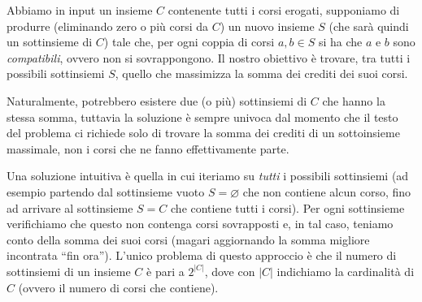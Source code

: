 

Abbiamo in input un insieme $C$ contenente tutti i corsi erogati, supponiamo di produrre (eliminando zero o più corsi da $C$) un nuovo insieme $S$ (che sarà quindi un sottinsieme di $C$) tale che, per ogni coppia di corsi $a, b \in S$ si ha che $a$ e $b$ sono \emph{compatibili}, ovvero non si sovrappongono. Il nostro obiettivo è trovare, tra tutti i possibili sottinsiemi $S$, quello che massimizza la somma dei crediti dei suoi corsi.

Naturalmente, potrebbero esistere due (o più) sottinsiemi di $C$ che hanno la stessa somma, tuttavia la soluzione è sempre univoca dal momento che il testo del problema ci richiede solo di trovare la somma dei crediti di un sottoinsieme massimale, non i corsi che ne fanno effettivamente parte.

\Brute
Una soluzione intuitiva è quella in cui iteriamo su \emph{tutti} i possibili sottinsiemi (ad esempio partendo dal sottinsieme vuoto $S = \varnothing$ che non contiene alcun corso, fino ad arrivare al sottinsieme $S = C$ che contiene tutti i corsi). Per ogni sottinsieme verifichiamo che questo non contenga corsi sovrapposti e, in tal caso, teniamo conto della somma dei suoi corsi (magari aggiornando la somma migliore incontrata ``fin ora''). L'unico problema di questo approccio è che il numero di sottinsiemi di un insieme $C$ è pari a $2^{|C|}$, dove con $|C|$ indichiamo la cardinalità di $C$ (ovvero il numero di corsi che contiene).

